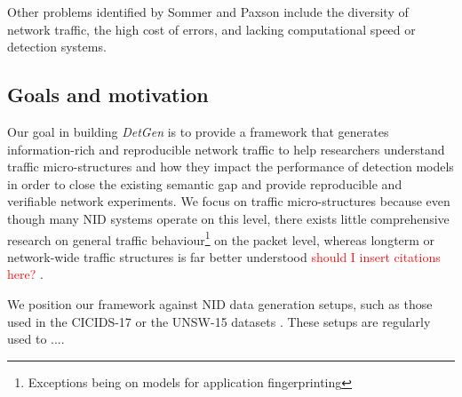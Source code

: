 \documentclass{article}
\begin{document}


\vspace{0.2cm}
Other problems identified by Sommer and Paxson include the diversity of network traffic, the high cost of errors, and lacking computational speed or detection systems.

\subsection{Goals and motivation}

Our goal in building \textit{DetGen} is to provide a framework that generates information-rich and reproducible network traffic to help researchers understand traffic micro-structures and how they impact the performance of detection models in order to close the existing semantic gap and provide reproducible and verifiable network experiments. We focus on traffic micro-structures because even though many NID systems operate on this level, there exists little comprehensive research on general traffic behaviour\footnote{Exceptions being on models for application fingerprinting} on the packet level, whereas longterm or network-wide traffic structures is far better understood \textcolor{red}{should I insert citations here? \cite{willinger1998self}}.

We position our framework against NID data generation setups, such as those used in the CICIDS-17 or the UNSW-15 datasets \cite{moustafa2015unsw,sharafaldin2018towards}. These setups are regularly used to ....




\end{document}
